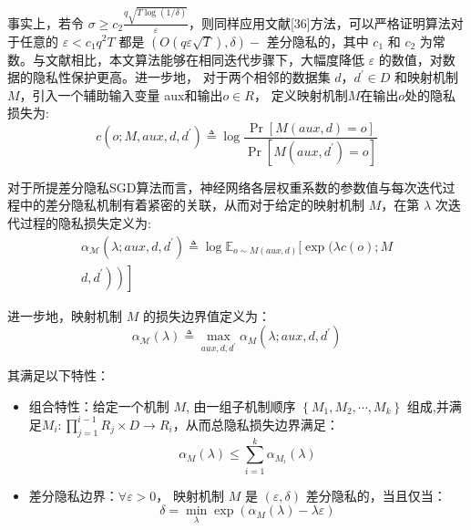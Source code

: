 事实上，若令 $\sigma \geqslant c_{2} \frac{q \sqrt{T \log (1 / \delta)}}{\varepsilon}$，则同样应用文献[36]方法，可以严格证明算法对于任意的 $\varepsilon<c_{1} q^{2} T$ 都是 $(O(q \varepsilon \sqrt{T}),\delta)-$ 差分隐私的，其中 $c_{1}$ 和 $c_{2}$ 为常数。与文献相比，本文算法能够在相同迭代步骤下，大幅度降低 $\varepsilon$ 的数值，对数据的隐私性保护更高。进一步地， 对于两个相邻的数据集 $d$，$d^{\prime} \in D$ 和映射机制 $M$，引入一个辅助输入变量 aux和输出$o \in R$， 定义映射机制$M$在输出$o$处的隐私损失为:
\begin{equation}
c\left(o ; M, a u x, d, d^{\prime}\right) \triangleq \log \frac{\operatorname{Pr}[M(a u x, d)=o]}{\operatorname{Pr}\left[M\left(a u x, d^{\prime}\right)=o\right]}
\end{equation}

对于所提差分隐私SGD算法而言，神经网络各层权重系数的参数值与每次迭代过程中的差分隐私机制有着紧密的关联，从而对于给定的映射机制 $M$，在第 $\lambda$ 次迭代过程的隐私损失定义为:
\begin{equation}\label{eq:隐私损失定义}
\begin{array}{r}
\alpha_{\mathcal{M}}\left(\lambda ; a u x, d, d^{\prime}\right) \triangleq \log \mathbb{E}_{o \sim M(a u x, d)}[\exp (\lambda c(o) ; M \\
\left.\left.\left.d,d^{\prime}\right)\right)\right]
\end{array}
\end{equation}

进一步地，映射机制 $M$ 的损失边界值定义为：
\begin{equation}\label{eq:损失边界值定义}
\alpha_{\mathcal{M}}(\lambda) \triangleq \max _{a u x, d, d^{\prime}} \alpha_{M}\left(\lambda ; a u x, d, d^{\prime}\right)
\end{equation}

其满足以下特性：

\begin{itemize}
\item 组合特性：给定一个机制 $M$, 由一组子机制顺序 $\left\{M_{1}, M_{2}, \cdots, M_{k}\right\}$ 组成,并满足$M_{i}: \prod_{j=1}^{i-1} R_{j} \times D \rightarrow R_{i}$，从而总隐私损失边界满足：
\begin{equation}\label{eq:损失边界值定义2}
\alpha_{M}(\lambda) \leqslant \sum_{i=1}^{k} \alpha_{M_{i}}(\lambda)
\end{equation}

\item 差分隐私边界：$\forall \varepsilon>0$， 映射机制 $M$ 是 $(\varepsilon,\delta)$ 差分隐私的，当且仅当：
\begin{equation}\label{eq:损失边界值定义2}
\delta=\min _{\lambda} \exp \left(\alpha_{M}(\lambda)-\lambda \varepsilon\right)
\end{equation}
\end{itemize}

